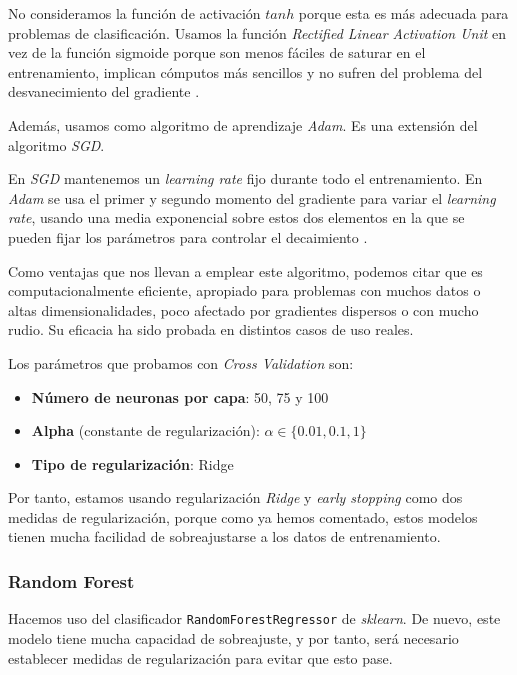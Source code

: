 \documentclass[11pt]{article}
\begin{document}
No consideramos la función de activación $tanh$ porque esta es más adecuada para problemas de clasificación. Usamos la función \emph{Rectified Linear Activation Unit} en vez de la función sigmoide porque son menos fáciles de saturar en el entrenamiento, implican cómputos más sencillos y no sufren del problema del desvanecimiento del gradiente \cite{relu:online}.

Además, usamos como algoritmo de aprendizaje \emph{Adam}. Es una extensión del algoritmo \emph{SGD}.

En \emph{SGD} mantenemos un \emph{learning rate} fijo durante todo el entrenamiento. En \emph{Adam} se usa el primer y segundo momento del gradiente para variar el \emph{learning rate}, usando una media exponencial sobre estos dos elementos en la que se pueden fijar los parámetros para controlar el decaimiento \cite{adam:online}.

Como ventajas que nos llevan a emplear este algoritmo, podemos citar que es computacionalmente eficiente, apropiado para problemas con muchos datos o altas dimensionalidades, poco afectado por gradientes dispersos o con mucho rudio. Su eficacia ha sido probada en distintos casos de uso reales.

Los parámetros que probamos con \emph{Cross Validation} son:

\begin{itemize}
  \item \textbf{Número de neuronas por capa}: 50, 75 y 100
  \item \textbf{Alpha} (constante de regularización): $\alpha \in \{0.01, 0.1, 1\}$
  \item \textbf{Tipo de regularización}: Ridge
\end{itemize}

Por tanto, estamos usando regularización \emph{Ridge} y \emph{early stopping} como dos medidas de regularización, porque como ya hemos comentado, estos modelos tienen mucha facilidad de sobreajustarse a los datos de entrenamiento.

\subsubsection{Random Forest} \label{random_forest}

Hacemos uso del clasificador \lstinline{RandomForestRegressor} de \emph{sklearn}. De nuevo, este modelo tiene mucha capacidad de sobreajuste, y por tanto, será necesario establecer medidas de regularización para evitar que esto pase.
\end{document}
